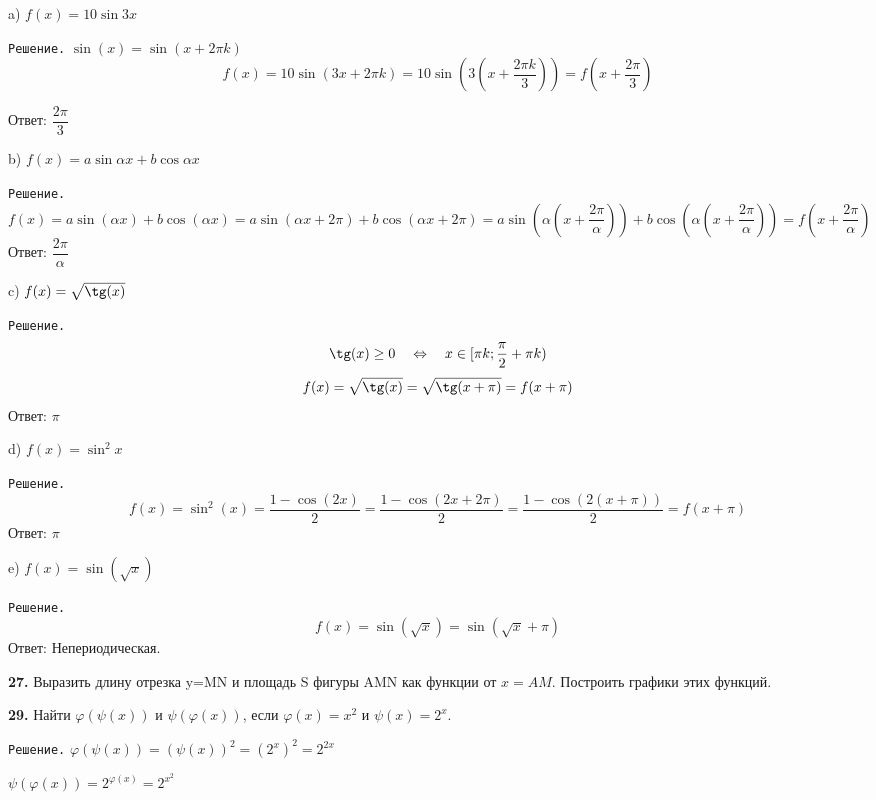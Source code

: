 \documentclass[12pt]{article}
\begin{document}
	a) $f(x) = 10\sin3x$
	
	{\tt Решение.} $\sin(x) = \sin(x+2\pi k)$
	\[
		f(x) = 10\sin(3x+2\pi k) = 10\sin(3(x+\dfrac{2\pi k}{3})) = f(x+\dfrac{2\pi}{3})
	\]
	
	\hspace{3mm}Ответ: $\dfrac{2\pi}{3}$\vspace{2mm} 
	
	b) $f(x) =a\sin \alpha x+b\cos \alpha x$
	
	{\tt Решение.} 
	\[
		f(x) = a\sin(\alpha x) +b\cos(\alpha x) = a\sin(\alpha x+2\pi)+b\cos(\alpha x+2\pi) = a\sin(\alpha(x+\dfrac{2\pi}{\alpha}))+b\cos(\alpha(x+\dfrac{2\pi}{\alpha})) = f(x+\dfrac{2\pi}{\alpha})
	\]
	Ответ: $\dfrac{2\pi}{\alpha}$\vspace{2mm}

c) $f(x) = \sqrt{\tg(x)}$

{\tt Решение.}
\[
	\tg(x)\ge 0 \quad \Leftrightarrow\quad x\in [\pi k; \dfrac{\pi}{2}+\pi k)
\]	
\[
	f(x) = \sqrt{\tg(x)} = \sqrt{\tg(x+\pi)} = f(x+\pi)
\]
Ответ: $\pi$
	
	d) $f(x) = \sin^2 x$
	
	{\tt Решение.} 
\[
	f(x) = \sin^2(x) = \dfrac{1-\cos(2x)}{2} = \dfrac{1-\cos(2x+2\pi)}{2} = \dfrac{1-\cos(2(x+\pi))}{2} = f(x+\pi)
\]
Ответ: $\pi$
	
	e) $f(x) = \sin(\sqrt{x})$
	
	{\tt Решение.}
\[
	f(x) = \sin(\sqrt{x}) = \sin(\sqrt{x}+\pi)
\]
Ответ: Непериодическая.\vspace{2mm}

{\bf 27.} Выразить длину отрезка y=MN и площадь S фигуры AMN как функции от $x=AM$. Построить графики этих функций.

	
	
	\newpage
	
	{\bf 29.} Найти $\varphi(\psi(x))$ и $\psi(\varphi(x))$, если $\varphi(x)=x^2$ и $\psi(x)=2^x$.
	
	{\tt Решение.} $\varphi(\psi(x)) = (\psi(x))^2 = (2^x)^2 = 2^{2x}$
	
	$\psi(\varphi(x)) = 2^{\varphi(x)} = 2^{x^2}$
	
\end{document}

